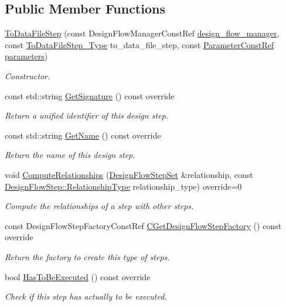\subsection*{Public Member Functions}
\begin{DoxyCompactItemize}
\item 
\hyperlink{classToDataFileStep_a0ad1828f717a6a265726be6aad982a2f}{To\+Data\+File\+Step} (const Design\+Flow\+Manager\+Const\+Ref \hyperlink{classDesignFlowStep_ab770677ddf087613add30024e16a5554}{design\+\_\+flow\+\_\+manager}, const \hyperlink{to__data__file__step_8hpp_a11e82da7dd30bcde03a139fc0baa4f38}{To\+Data\+File\+Step\+\_\+\+Type} to\+\_\+data\+\_\+file\+\_\+step, const \hyperlink{Parameter_8hpp_a37841774a6fcb479b597fdf8955eb4ea}{Parameter\+Const\+Ref} \hyperlink{classDesignFlowStep_a802eaafe8013df706370679d1a436949}{parameters})
\begin{DoxyCompactList}\small\item\em Constructor. \end{DoxyCompactList}\item 
const std\+::string \hyperlink{classToDataFileStep_ad4d235d11fd907c9d593f73e55609022}{Get\+Signature} () const override
\begin{DoxyCompactList}\small\item\em Return a unified identifier of this design step. \end{DoxyCompactList}\item 
const std\+::string \hyperlink{classToDataFileStep_ada4a3271187ee310379405eaaefc24e1}{Get\+Name} () const override
\begin{DoxyCompactList}\small\item\em Return the name of this design step. \end{DoxyCompactList}\item 
void \hyperlink{classToDataFileStep_aa2644f2c16d52ff381a6c52eef19c7c5}{Compute\+Relationships} (\hyperlink{classDesignFlowStepSet}{Design\+Flow\+Step\+Set} \&relationship, const \hyperlink{classDesignFlowStep_a723a3baf19ff2ceb77bc13e099d0b1b7}{Design\+Flow\+Step\+::\+Relationship\+Type} relationship\+\_\+type) override=0
\begin{DoxyCompactList}\small\item\em Compute the relationships of a step with other steps. \end{DoxyCompactList}\item 
const Design\+Flow\+Step\+Factory\+Const\+Ref \hyperlink{classToDataFileStep_a2c4090d1f2b890df6a10cc716221c9e9}{C\+Get\+Design\+Flow\+Step\+Factory} () const override
\begin{DoxyCompactList}\small\item\em Return the factory to create this type of steps. \end{DoxyCompactList}\item 
bool \hyperlink{classToDataFileStep_a22c665fe60796cdd10b779df3198cb51}{Has\+To\+Be\+Executed} () const override
\begin{DoxyCompactList}\small\item\em Check if this step has actually to be executed. \end{DoxyCompactList}\end{DoxyCompactItemize}
